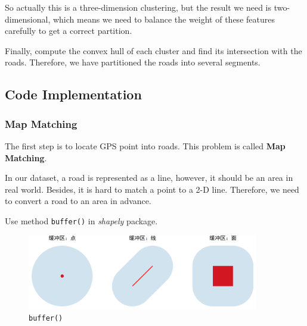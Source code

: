 \documentclass[fontset=none]{ctexart}
\theoremstyle{definition}
\theoremstyle{remark}
\begin{document}
So actually this is a three-dimension clustering, but the result we need is two-dimensional, which means
we need to balance the weight of these features carefully to get a correct partition.
\begin{figure}[h]
  \centering
  \quad
\end{figure}

Finally, compute the convex hull of each cluster and find its intersection with the roads.
Therefore, we have partitioned the roads into several segments.

\clearpage
\subsection{Code Implementation}
\subsubsection{Map Matching}
The first step is to locate GPS point into roads. This problem is called \textbf{Map Matching}.

In our dataset, a road is represented as a line, however, it should be an area in real world.
Besides, it is hard to match a point to a 2-D line. Therefore, we need to convert a road to an area in advance.

Use method \texttt{buffer()} in \textit{shapely} package.
\begin{figure}[htb]
  \centering
  \includegraphics[width=0.9\textwidth]{images/buffer_example.png}
  \caption{\texttt{buffer()}}
  \label{fig: buffer}
\end{figure}
\end{document}
